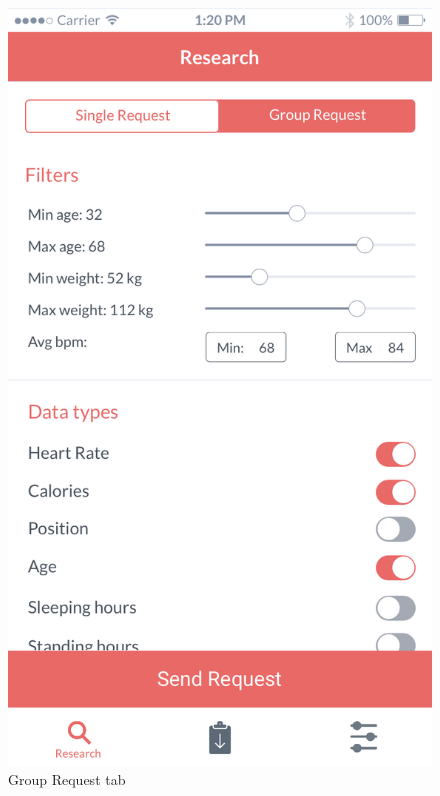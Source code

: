 \documentclass[titlepage]{article}
\begin{document}
\begin{itemize}
\begin{itemize}
\begin{itemize}
					\begin{figure}[H]
						\center
  						\includegraphics[width=0.5\columnwidth]{Mockup/mockupGroupRequest.png}
  						\caption{Group Request tab}
 					 	\label{fig:GRtab}
					\end{figure}


\end{itemize}
\end{itemize}
\end{itemize}
\end{document}
